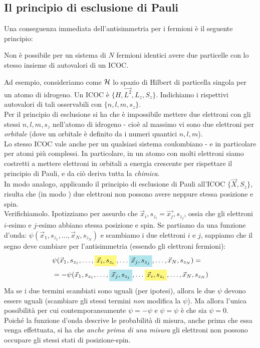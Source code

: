 \documentclass[../../FisicaTeorica.tex]{subfiles}
\begin{document}
\subsection{Il principio di esclusione di Pauli}
Una conseguenza immediata dell'antisimmetria per i fermioni è il seguente principio:
\begin{thm}
Non è possibile per un sistema di $N$ fermioni identici avere due particelle con lo stesso insieme di autovalori di un ICOC.
\end{thm}
Ad esempio, consideriamo come $\mathcal{H}$ lo spazio di Hilbert di particella singola per un atomo di idrogeno. Un ICOC è $\{H, \vec{L^2}, L_z, S_z\}$. Indichiamo i rispettivi autovalori di tali osservabili con $\{n, l, m, s_z\}$.\\
Per il principio di esclusione si ha che è impossibile mettere due elettroni con gli stessi $n, l, m, s_z$ nell'atomo di idrogeno - cioè al massimo vi sono due elettroni per \textit{orbitale} (dove un orbitale è definito da i numeri quantici $n,l,m$).\\
Lo stesso ICOC vale anche per un qualsiasi sistema coulombiano - e in particolare per atomi più complessi. In particolare, in un atomo con molti elettroni siamo costretti a mettere elettroni in orbitali a energia crescente per rispettare il principio di Pauli, e da ciò deriva tutta la \textit{chimica}.\\
In modo analogo, applicando il principio di esclusione di Pauli all'ICOC $\{\vec{X}, S_z\}$, risulta che (in modo ) due elettroni non possono avere neppure  stessa posizione e spin.\\
Verifichiamolo. Ipotizziamo per assurdo che $\vec{x}_i, s_{z_i} = \vec{x_j}, s_{z_j}$, ossia che gli elettroni $i$-esimo e $j$-esimo abbiano stessa posizione e spin. Se partiamo da una funzione d'onda:
$\psi(\vec{x}_1, s_{z_1}, \dots, \vec{x}_N, s_{z_N})$
e scambiamo i due elettroni $i$ e $j$, sappiamo che il segno deve cambiare per l'antisimmetria (essendo gli elettroni fermioni):
\begin{align*}
&\psi(\vec{x}_1, s_{z_1}, \dots, \hlc{Yellow}{\vec{x}_i, s_{z_i}}, \dots \hlc{SkyBlue}{\vec{x}_j, s_{z_j}}, \dots, \vec{x}_N, s_{z_N})=\\
&=-
\psi(\vec{x}_1, s_{z_1}, \dots, \hlc{SkyBlue}{\vec{x}_j, s_{z_j}}, \dots \hlc{Yellow}{\vec{x}_i, s_{z_i}}, \dots, \vec{x}_N, s_{z_N})
\end{align*}
Ma se i due termini scambiati sono uguali (per ipotesi), allora le due $\psi$ devono essere uguali (scambiare gli stessi termini \textit{non} modifica la $\psi$). Ma allora l'unica possibilità per cui contemporaneamente $\psi=-\psi$ e $\psi=\psi$ è che sia $\psi=0$.\\
Poiché la funzione d'onda descrive le probabilità di misura, anche prima che essa venga effettuata, si ha che \textit{anche prima di una misura} gli elettroni non possono occupare gli stessi stati di posizione-spin.\\
\end{document}

